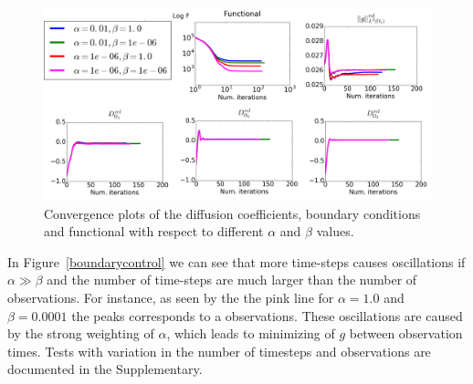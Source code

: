 \documentclass[11pt,a4paper]{article}
\begin{document}
\begin{figure}
\centering
\includegraphics[scale=0.18]{Convergence-plot.png}   
\caption{Convergence plots of the diffusion coefficients, boundary conditions and functional with respect to different $\alpha$ and $\beta$ values. } 
\label{convergence}
\end{figure}

In Figure~\ref{boundarycontrol} we can see that more time-steps causes oscillations if $\alpha\gg\beta$ and the number of time-steps are much larger than the number of observations. For instance, as seen by the the pink line for $\alpha=1.0$ and $\beta=0.0001$ the peaks corresponds to a observations. These oscillations are caused by the strong weighting of $\alpha$, which leads to minimizing of $g$ between observation times. 
Tests with variation in the number of timesteps and observations are documented in the Supplementary. 

\end{document}
